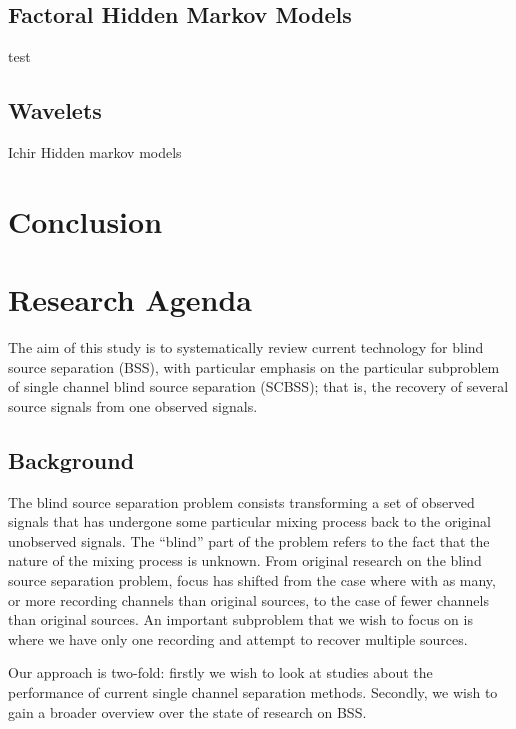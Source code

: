 \documentclass[11pt, oneside, a4paper]{article}
\begin{document}
\subsection{Factoral Hidden Markov Models} %
test

\subsection{Wavelets} %




Ichir Hidden markov models

\section{Conclusion}

\appendix


\section{Research Agenda}
The aim of this study is to systematically review current technology
for blind source separation (BSS), with particular emphasis on the
particular subproblem of single channel blind source separation
(SCBSS); that is, the recovery of several source signals from one observed signals.


\subsection{Background}
The blind source separation problem consists transforming a set of observed signals that has undergone some particular mixing process back to the original unobserved signals. The “blind” part of the problem refers to the fact that the nature of the mixing process is unknown. From original research on the blind source separation problem, focus has shifted from the case where with as many, or more recording channels than original sources, to the case of fewer channels than original sources. An important subproblem that we wish to focus on is where we have only one recording and attempt to recover multiple sources.

Our approach is two-fold: firstly we wish to look at studies about the performance of current single channel separation methods. Secondly, we wish to gain a broader overview over the state of research on BSS.
\end{document}
